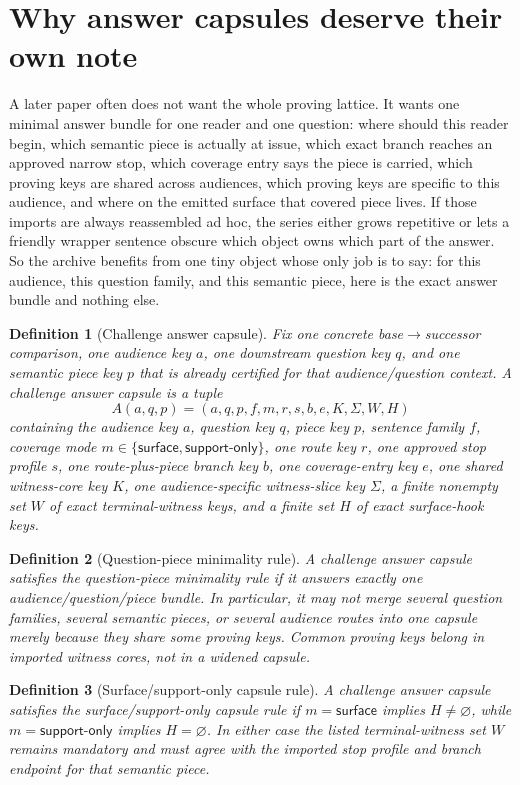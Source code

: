 \documentclass[11pt]{article}
\newtheorem{definition}{Definition}
\begin{document}
\section{Why answer capsules deserve their own note}
A later paper often does not want the whole proving lattice.
It wants one minimal answer bundle for one reader and one question: where should this reader begin, which semantic piece is actually at issue, which exact branch reaches an approved narrow stop, which coverage entry says the piece is carried, which proving keys are shared across audiences, which proving keys are specific to this audience, and where on the emitted surface that covered piece lives.
If those imports are always reassembled ad hoc, the series either grows repetitive or lets a friendly wrapper sentence obscure which object owns which part of the answer.
So the archive benefits from one tiny object whose only job is to say: for this audience, this question family, and this semantic piece, here is the exact answer bundle and nothing else.

\begin{definition}[Challenge answer capsule]
Fix one concrete base$\to$successor comparison, one audience key $a$, one downstream question key $q$, and one semantic piece key $p$ that is already certified for that audience/question context.
A \emph{challenge answer capsule} is a tuple
\[
A(a,q,p)=(a,q,p,f,m,r,s,b,e,K,\Sigma,W,H)
\]
containing the audience key $a$, question key $q$, piece key $p$, sentence family $f$, coverage mode $m\in\{\textsf{surface},\textsf{support-only}\}$, one route key $r$, one approved stop profile $s$, one route-plus-piece branch key $b$, one coverage-entry key $e$, one shared witness-core key $K$, one audience-specific witness-slice key $\Sigma$, a finite nonempty set $W$ of exact terminal-witness keys, and a finite set $H$ of exact surface-hook keys.
\end{definition}

\begin{definition}[Question-piece minimality rule]
A challenge answer capsule satisfies the \emph{question-piece minimality rule} if it answers exactly one audience/question/piece bundle.
In particular, it may not merge several question families, several semantic pieces, or several audience routes into one capsule merely because they share some proving keys.
Common proving keys belong in imported witness cores, not in a widened capsule.
\end{definition}

\begin{definition}[Surface/support-only capsule rule]
A challenge answer capsule satisfies the \emph{surface/support-only capsule rule} if $m=\textsf{surface}$ implies $H\neq\varnothing$, while $m=\textsf{support-only}$ implies $H=\varnothing$.
In either case the listed terminal-witness set $W$ remains mandatory and must agree with the imported stop profile and branch endpoint for that semantic piece.
\end{definition}
\end{document}
